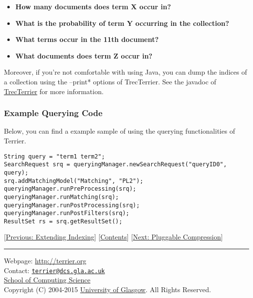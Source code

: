 \begin{itemize}
\tightlist
\item
  \textbf{How many documents does term X occur in?}
\item
  \textbf{What is the probability of term Y occurring in the
  collection?}\\
\item
  \textbf{What terms occur in the 11th document?}\\
\item
  \textbf{What documents does term Z occur in?}\\
\end{itemize}

Moreover, if you're not comfortable with using Java, you can dump the
indices of a collection using the --print* options of TrecTerrier. See
the javadoc of
\href{javadoc/org/terrier/applications/TrecTerrier.html}{TrecTerrier}
for more information.

\subsubsection{Example Querying Code}\label{example-querying-code}

Below, you can find a example sample of using the querying
functionalities of Terrier.

\begin{verbatim}
String query = "term1 term2";
SearchRequest srq = queryingManager.newSearchRequest("queryID0", query);
srq.addMatchingModel("Matching", "PL2");
queryingManager.runPreProcessing(srq);
queryingManager.runMatching(srq);
queryingManager.runPostProcessing(srq);
queryingManager.runPostFilters(srq);
ResultSet rs = srq.getResultSet();
\end{verbatim}

{[}\href{extend_indexing.html}{Previous: Extending Indexing}{]}
{[}\href{index.html}{Contents}{]} {[}\href{compression.html}{Next:
Pluggable Compression}{]}

\begin{center}\rule{0.5\linewidth}{\linethickness}\end{center}

Webpage: \url{http://terrier.org}\\
Contact:
\href{mailto:terrier@dcs.gla.ac.uk}{\nolinkurl{terrier@dcs.gla.ac.uk}}\\
\href{http://www.dcs.gla.ac.uk/}{School of Computing Science}\\
Copyright (C) 2004-2015 \href{http://www.gla.ac.uk/}{University of
Glasgow}. All Rights Reserved.

